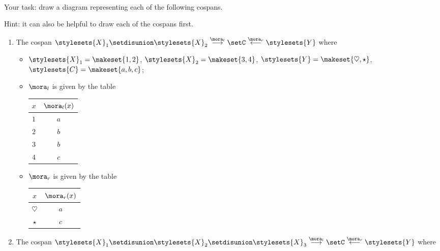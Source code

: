 {\begin{gradedexercise}
    \

    Your task: draw a diagram representing each of the following cospans.

    Hint: it can also be helpful to draw each of the cospans first.

    \begin{enumerate}
        \item The cospan $\stylesets{X}_1 \setdisunion \stylesets{X}_2 \overset{\mora_l}{\longrightarrow} \setC \overset{\mora_r}{\longleftarrow}  \stylesets{Y}$ where
              \begin{itemize}
                  \item $\stylesets{X}_1 = \makeset{1, 2}$, $\stylesets{X}_2 = \makeset{3, 4}$, $\stylesets{Y} = \makeset{\heartsuit, \star}$, $\stylesets{C} = \makeset{a, b, c}$;
                  \item $\mora_l$ is given by the table
                        \begin{center}
                            \begin{tabular}{c|c}
                                $x$ & $\mora_l(x)$ \\
                                \hline
                                $1$ & $a$ \\
                                $2$ & $b$ \\
                                $3$ & $b$ \\
                                $4$ & $c$
                            \end{tabular}
                        \end{center}
                  \item $\mora_r$ is given by the table
                        \begin{center}
                            \begin{tabular}{c|c}
                                $x$          & $\mora_r(x)$ \\
                                \hline
                                $\heartsuit$ & $a$ \\
                                $\star$      & $c$
                            \end{tabular}
                        \end{center}
              \end{itemize}
        \item The cospan $\stylesets{X}_1 \setdisunion \stylesets{X}_2 \setdisunion \stylesets{X}_3 \overset{\mora_l}{\longrightarrow} \setC \overset{\mora_r}{\longleftarrow} \stylesets{Y}$ where

\end{enumerate}
\end{gradedexercise}}
